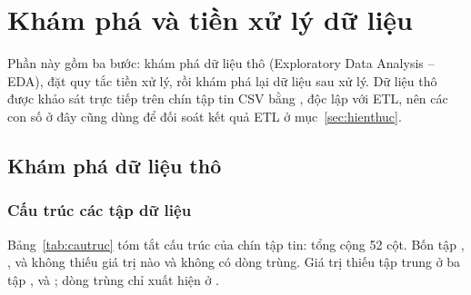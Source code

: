 \section{Khám phá và tiền xử lý dữ liệu}\label{sec:eda}

Phần này gồm ba bước: khám phá dữ liệu thô (Exploratory Data Analysis -- EDA), đặt quy tắc tiền xử lý, rồi khám phá lại dữ liệu sau xử lý. Dữ liệu thô được khảo sát trực tiếp trên chín tập tin CSV bằng , độc lập với ETL, nên các con số ở đây cũng dùng để đối soát kết quả ETL ở mục~\ref{sec:hienthuc}.

\subsection{Khám phá dữ liệu thô}\label{sec:edatho}

\subsubsection{Cấu trúc các tập dữ liệu}

Bảng~\ref{tab:cautruc} tóm tắt cấu trúc của chín tập tin: tổng cộng 52 cột. Bốn tập , ,  và  không thiếu giá trị nào và không có dòng trùng. Giá trị thiếu tập trung ở ba tập ,  và ; dòng trùng chỉ xuất hiện ở .

